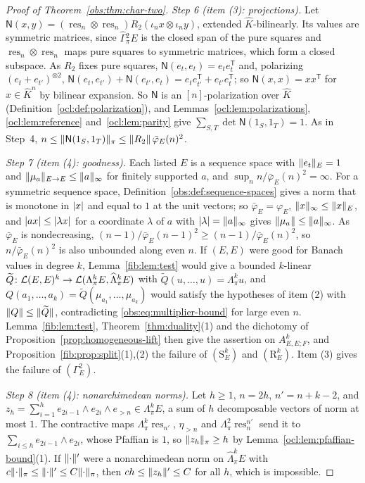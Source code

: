 \begin{proof}[Proof of Theorem~\ref{obs:thm:char-two}]
\emph{Step 6 (item (3): projections).} Let $\mathsf N(x,y)=(\operatorname{res}_n\otimes\operatorname{res}_n)
R_2(\iota_nx\otimes\iota_ny)$, extended $\widehat K$-bilinearly. Its values are symmetric matrices, since
$\widehat\Gamma{}^2_\pi E$ is the closed span of the pure squares and $\operatorname{res}_n\otimes\operatorname{res}_n$
maps pure squares to symmetric matrices, which form a closed subspace. As $R_2$ fixes pure squares,
$\mathsf N(e_t,e_t)=e_te_t^{\mathsf T}$ and, polarizing $(e_t+e_{t'})^{\otimes2}$,
$\mathsf N(e_t,e_{t'})+\mathsf N(e_{t'},e_t)=e_te_{t'}^{\mathsf T}+e_{t'}e_t^{\mathsf T}$; so
$\mathsf N(x,x)=xx^{\mathsf T}$ for $x\in\widehat K^n$ by bilinear expansion. So $\mathsf N$ is an $[n]$-polarization
over $\widehat K$ (Definition~\ref{ocl:def:polarization}), and Lemmas~\ref{ocl:lem:polarizations}, \ref{ocl:lem:reference} and~\ref{ocl:lem:parity} give $\sum_{S,T}\det\mathsf N(1_S,1_T)=1$. As in Step~4,
$n\le\lVert \mathsf N(1_S,1_T)\rVert_\pi\le\lVert R_2\rVert\,\bar\varphi_E(n)^2$.

\emph{Step 7 (item (4): goodness).} Each listed $E$ is a sequence space with $\lVert e_t\rVert_E=1$ and
$\lVert \mu_a\rVert_{E\to E}\le\lVert a\rVert_\infty$ for finitely supported $a$, and $\sup_nn/\bar\varphi_E(n)^2=\infty$. For a
symmetric sequence space, Definition~\ref{obs:def:sequence-spaces} gives a norm that is monotone in $\lvert x\rvert$ and equal
to $1$ at the unit vectors; so $\bar\varphi_E=\varphi_E$, $\lVert x\rVert_\infty\le\lVert x\rVert_E$, and $\lvert ax\rvert\le\lvert \lambda x\rvert$
for a coordinate $\lambda$ of $a$ with $\lvert \lambda\rvert=\lVert a\rVert_\infty$ gives $\lVert \mu_a\rVert\le\lVert a\rVert_\infty$. As
$\bar\varphi_E$ is nondecreasing, $(n-1)/\bar\varphi_E(n-1)^2\ge(n-1)/\bar\varphi_E(n)^2$, so $n/\bar\varphi_E(n)^2$ is
also unbounded along even $n$. If $(E,E)$ were good for Banach values in degree $k$, Lemma~\ref{fib:lem:test} would give
a bounded $k$-linear $\widetilde Q\colon\mathcal L(E,E)^k\to\mathcal L(\Lambda^k_\pi E,\widehat\Lambda^k_\pi E)$ with
$\widetilde Q(u,\dots,u)=\Lambda^k_\pi u$, and $Q(a_1,\dots,a_k)=\widetilde Q(\mu_{a_1},\dots,\mu_{a_k})$ would satisfy
the hypotheses of item (2) with $\lVert Q\rVert\le\lVert \widetilde Q\rVert$, contradicting \eqref{obs:eq:multiplier-bound} for large
even $n$. Lemma~\ref{fib:lem:test}, Theorem~\ref{thm:duality}(1) and the dichotomy of Proposition~\ref{prop:homogeneous-lift} then give the assertion on $A^k_{E,E;F}$, and
Proposition~\ref{fib:prop:split}(1),(2) the failure of $(\mathrm S^k_E)$ and $(\mathrm R^k_E)$. Item (3) gives the failure of
$(\Gamma^2_E)$.

\emph{Step 8 (item (4): nonarchimedean norms).} Let $h\ge1$, $n=2h$, $n'=n+k-2$, and
$z_h=\sum_{i=1}^he_{2i-1}\wedge e_{2i}\wedge e_{>n}\in\Lambda^k_\pi E$, a sum of $h$ decomposable vectors of norm at
most $1$.
The contractive maps $\Lambda^k_\pi\operatorname{res}_{n'}$, $\eta_{>n}$ and $\Lambda^2_\pi\operatorname{res}^{n'}_n$ send
it to $\sum_{i\le h}e_{2i-1}\wedge e_{2i}$, whose Pfaffian is $1$, so $\lVert z_h\rVert_\pi\ge h$ by
Lemma~\ref{ocl:lem:pfaffian-bound}(1). If $\lVert \cdot\rVert'$ were a nonarchimedean norm on $\widehat\Lambda^k_\pi E$ with
$c\lVert \cdot\rVert_\pi\le\lVert \cdot\rVert'\le C\lVert \cdot\rVert_\pi$, then $ch\le\lVert z_h\rVert'\le C$ for all $h$, which is impossible.


\end{proof}
